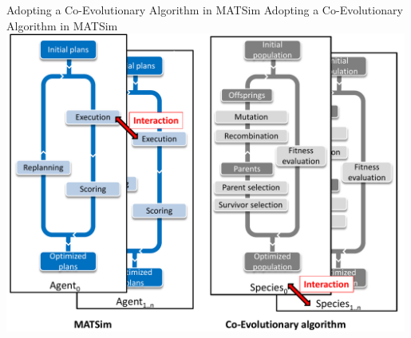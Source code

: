 \createfigure%
{Adopting a Co-Evolutionary Algorithm in MATSim}%
{Adopting a Co-Evolutionary Algorithm in MATSim}%
{\label{fig:ea}}%
{\includegraphics[width=0.99\textwidth, angle=0]{using/figures/MATSimVSea.pdf}}%
{}


